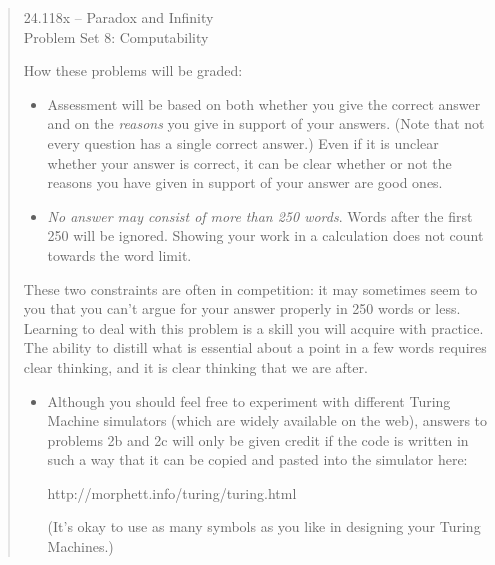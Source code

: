 \documentclass[12pt,a4paper]{article}
\begin{document}
\begin{quote}

\begin{center} {\large 24.118x -- Paradox and Infinity \\ \vspace{1mm}}
 {\large Problem Set 8: Computability \\ \vspace{1mm}}
 
\end{center}
\vspace{3mm}

\noindent How these problems will be graded:

\begin{itemize} 

\item Assessment will be based on both whether you give the correct answer and on the \emph{reasons} you give in support of your answers. (Note that not every question has a single correct answer.) Even if it is unclear whether your answer is correct, it can be clear whether or not the reasons you have given in support of your answer are good ones. 

\item  \emph{No answer may consist of more than 250 words}. Words after the first 250 will be ignored. Showing your work in a calculation does not count towards the word limit.


\end{itemize} 

These two constraints are often in competition: it may sometimes seem to you that you can't argue for your answer properly in 250 words or less. Learning to deal with this problem is a skill you will acquire with practice. The ability to distill what is essential about a point in a few words requires clear thinking, and it is clear thinking that we are after.

\begin{itemize}


\item Although you should feel free to experiment with different Turing Machine simulators (which are widely available on the web), answers to problems 2b and 2c will only be given credit if the code is written in such a way that it can be copied and pasted into the simulator here:
\begin{center}
http://morphett.info/turing/turing.html
\end{center}
(It's okay to use as many symbols as you like in designing your Turing Machines.)

\end{itemize} 
\end{quote}
\end{document}
